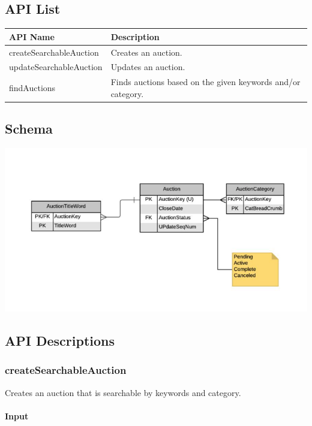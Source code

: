 \documentclass[12pt,a4paper]{article}
\begin{document}
\subsection{API List}
\begin{center}
    \begin{tabular}{| l | l |}
        \hline
        \textbf{API Name} & \textbf{Description} \\
        \hline
            createSearchableAuction & Creates an auction. \\ 
        \hline
            updateSearchableAuction & Updates an auction. \\
        \hline
            findAuctions & Finds auctions based on the given keywords and/or category. \\
        \hline
    \end{tabular}
\end{center}

\subsection{Schema}

\includegraphics[scale=0.5]{images/Screen Shot 2021-01-22 at 11.34.49 PM.png}
\pagebreak
\subsection{API Descriptions}

\subsubsection{createSearchableAuction}
\label{ref:csa}
Creates an auction that is searchable by keywords and category. 


\paragraph{Input}
\end{document}
